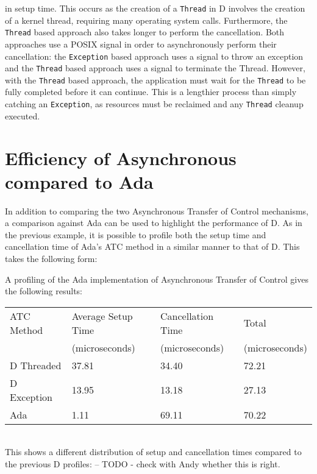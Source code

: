 in setup time. This occurs as the creation of a \texttt{Thread} in D involves
the creation of a kernel thread, requiring many operating system calls.
Furthermore, the \texttt{Thread} based approach also takes longer to perform
the cancellation. Both approaches use a POSIX signal in order to asynchronously
perform their cancellation: the \texttt{Exception} based approach uses a signal
to throw an exception and the \texttt{Thread} based approach uses a signal to
terminate the Thread. However, with the \texttt{Thread} based approach, the
application must wait for the \texttt{Thread} to be fully completed before it can
continue. This is a lengthier process than simply catching an
\texttt{Exception}, as resources must be reclaimed and any \texttt{Thread}
cleanup executed. 

\section{Efficiency of Asynchronous compared to Ada}
In addition to comparing the two Asynchronous Transfer of Control mechanisms, a
comparison against Ada can be used to highlight the performance of D. As in the
previous example, it is possible to profile both the setup time and cancellation
time of Ada's ATC method in a similar manner to that of D. This takes the
following form: 

A profiling of the Ada implementation of Asynchronous Transfer of Control gives
the following results: 
\begin{table}[!htbp]
\begin{tabular}{l|lll}
ATC Method & Average Setup Time & Cancellation Time  & Total          \\
           & (microseconds)     & (microseconds)     & (microseconds) \\ \hline
D Threaded &  37.81             & 34.40              & 72.21          \\
D Exception & 13.95             & 13.18              & 27.13          \\
Ada         &  1.11             & 69.11              & 70.22          \\
\end{tabular}
\end{table} \\
This shows a different distribution of setup and cancellation times compared to
the previous D profiles: 
-- TODO - check with Andy whether this is right. 
